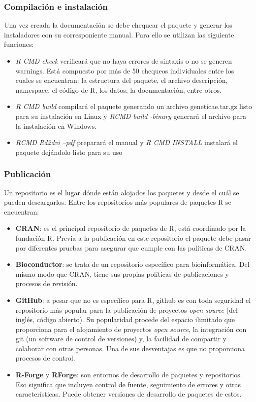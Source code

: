 \subsubsection{Compilación e instalación}
Una vez creada la documentación se debe chequear el paquete y generar los instaladores con su corresponiente manual. Para ello se utilizan las siguiente funciones:
\begin{itemize}
\item \emph{R CMD check} verificará que no haya errores de sintaxis o no se generen warnings. Está compuesto por más de 50 chequeos individuales entre los cuales se encuentran: la estructura del paquete, el archivo descripción, namespace, el código de R, los datos, la documentación, entre otros.
\item  \emph{R CMD build} compilará el paquete generando un archivo geneticae.tar.gz listo para su instalación en Linux y \emph{RCMD build -binary} generará el archivo para la instalación en Windows.
\item \emph{RCMD Rd2dvi --pdf} preparará el manual y \emph{R CMD INSTALL} instalará el paquete dejándolo listo para su uso
\end{itemize}

\subsubsection{Publicación}
Un repositorio es el lugar dónde están alojados los paquetes y desde el cuál se pueden descargarlos. Entre los repositorios más populares de paquetes R se encuentran:

\begin{itemize}
\item \textbf{CRAN}: es el principal repositorio de paquetes de R, está coordinado por la fundación R. Previa a la publicación en este repositorio el paquete debe pasar por diferentes pruebas para asegurar que cumple con las políticas de CRAN.

\item \textbf{Bioconductor}: se trata de un repositorio específico para bioinformática. Del mismo modo que CRAN, tiene sus propias políticas de publicaciones y procesos de revisión.

\item \textbf{GitHub}: a pesar que no es específico para R, github es con toda seguridad el repositorio más popular para la publicación de proyectos \emph{open source} (del inglés, código abierto). Su popularidad procede del espacio ilimitado que proporciona para el alojamiento de proyectos \emph{open source}, la integración con git (un software de control de versiones) y, la facilidad de compartir y colaborar con otras personas. Una de sus desventajas es que no proporciona procesos de control.

\item \textbf{R-Forge} y \textbf{RForge}: son entornos de desarrollo de paquetes y repositorios. Eso significa que incluyen control de fuente, seguimiento de errores y otras características. Puede obtener versiones de desarrollo de paquetes de estos.
\end{itemize}

